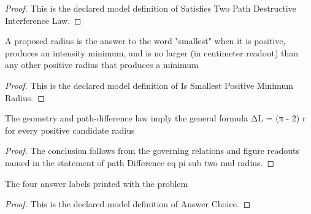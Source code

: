\begin{proof}
  This is the declared model definition of Satisfies Two Path Destructive Interference Law.
\end{proof}
\begin{definition}
  \label{def:physics:phyx-mini-0315:phyxminiproblems-problemphyxmini0315-issmallestpositiveminimumradius}
  A proposed radius is the answer to the word "smallest" when it is positive, produces an intensity minimum, and is no larger (in centimeter readout) than any other positive radius that produces a minimum
\end{definition}
\begin{proof}
  This is the declared model definition of Is Smallest Positive Minimum Radius.
\end{proof}
\begin{lemma}
  \label{lem:physics:phyx-mini-0315:phyxminiproblems-problemphyxmini0315-pathdifference-eq-pi-sub-two-mul-radius}
  The geometry and path-difference law imply the general formula ΔL = (π - 2) r for every positive candidate radius
\end{lemma}
\begin{proof}
  The conclusion follows from the governing relations and figure readouts named in the statement of path Difference eq pi sub two mul radius.
\end{proof}
\begin{definition}
  \label{def:physics:phyx-mini-0315:phyxminiproblems-problemphyxmini0315-answerchoice}
  The four answer labels printed with the problem
\end{definition}
\begin{proof}
  This is the declared model definition of Answer Choice.
\end{proof}
